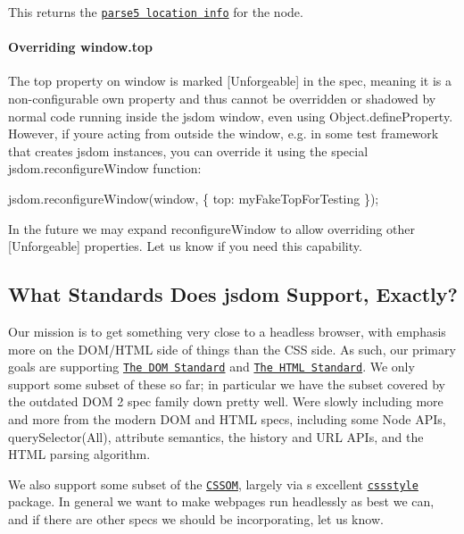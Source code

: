 This returns the \href{https://www.npmjs.com/package/parse5#options-locationinfo}{\tt parse5 location info} for the node.

\paragraph*{Overriding {\ttfamily window.\+top}}

The {\ttfamily top} property on {\ttfamily window} is marked {\ttfamily \mbox{[}Unforgeable\mbox{]}} in the spec, meaning it is a non-\/configurable own property and thus cannot be overridden or shadowed by normal code running inside the jsdom window, even using {\ttfamily Object.\+define\+Property}. However, if you\textquotesingle{}re acting from outside the window, e.\+g. in some test framework that creates jsdom instances, you can override it using the special {\ttfamily jsdom.\+reconfigure\+Window} function\+:


\begin{DoxyCode}
jsdom.reconfigureWindow(window, \{ top: myFakeTopForTesting \});
\end{DoxyCode}


In the future we may expand {\ttfamily reconfigure\+Window} to allow overriding other {\ttfamily \mbox{[}Unforgeable\mbox{]}} properties. Let us know if you need this capability.

\subsection*{What Standards Does jsdom Support, Exactly?}

Our mission is to get something very close to a headless browser, with emphasis more on the D\+O\+M/\+H\+T\+ML side of things than the C\+SS side. As such, our primary goals are supporting \href{http://dom.spec.whatwg.org/}{\tt The D\+OM Standard} and \href{http://www.whatwg.org/specs/web-apps/current-work/multipage/}{\tt The H\+T\+ML Standard}. We only support some subset of these so far; in particular we have the subset covered by the outdated D\+OM 2 spec family down pretty well. We\textquotesingle{}re slowly including more and more from the modern D\+OM and H\+T\+ML specs, including some {\ttfamily Node} A\+P\+Is, {\ttfamily query\+Selector(\+All)}, attribute semantics, the history and U\+RL A\+P\+Is, and the H\+T\+ML parsing algorithm.

We also support some subset of the \href{http://dev.w3.org/csswg/cssom/}{\tt C\+S\+S\+OM}, largely via \href{https://github.com/chad3814}{\tt }\textquotesingle{}s excellent \href{https://www.npmjs.org/package/cssstyle}{\tt cssstyle} package. In general we want to make webpages run headlessly as best we can, and if there are other specs we should be incorporating, let us know. 